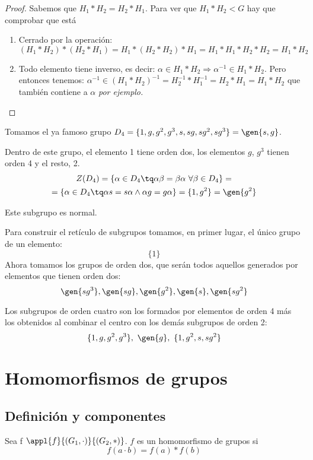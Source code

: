 \documentclass[nochap]{apuntes}
\begin{document}
 \begin{proof}
  Sabemos que $H_{1}\ast H_{2}=H_{2}\ast H_{1}$. Para ver que $H_{1}\ast H_{2}<G$  hay que comprobar que está
  \begin{enumerate}
   \item Cerrado por la operación: $(H_{1}\ast H_{2})\ast (H_{2}\ast H_{1})=H_{1}\ast (H_{2}\ast H_{2})\ast H_{1}=H_{1}\ast H_{1}\ast H_{2}\ast H_{2}=H_{1}\ast H_{2}$
   \item Todo elemento tiene inverso, es decir: $\alpha\in H_{1}\ast H_{2}\Rightarrow \alpha^{-1}\in H_{1}\ast H_{2}$. Pero entonces tenemos:
   $\alpha^{-1}\in (H_{1}\ast H_{2})^{-1} = H_{2}^{-1}\ast H_{1}^{-1}=H_{2}\ast H_{1}=H_{1}\ast H_{2}$ que también contiene a $\alpha$ \textit{por ejemplo.}
  \end{enumerate}

 \end{proof}

 \begin{example}
  Tomamos el ya famoso grupo $D_{4}=\{1,g,g^{2},g^{3}, s, sg, sg^{2}, sg^{3}\}=\gen{s,g}$.

  Dentro de este grupo, el elemento 1 tiene orden dos, los elementos $g$, $g^{3}$  tienen orden 4 y el resto, 2.
  \begin{gather*}
  Z(D_{4})= \{\alpha\in D_{4} \tq \alpha\beta=\beta\alpha \ \forall \beta \in D_{4}\}= \\
  = \{\alpha\in D_{4}\tq \alpha s = s\alpha \wedge \alpha g = g\alpha\}=\{1, g^{2}\}=\gen{g^{2}}
  \end{gather*}

  Este subgrupo es normal.

  Para construir el retículo de subgrupos tomamos, en primer lugar, el único grupo de un elemento:
  \[ \{1\} \]
  Ahora tomamos los grupos de orden dos, que serán todos aquellos generados por elementos que tienen orden dos:\\
  \[ \gen{sg^{3}}, \gen{sg}, \gen{g^{2}}, \gen{s}, \gen{sg^{2}} \]

  Los subgrupos de orden cuatro son los formados por elementos de orden 4 más los obtenidos al combinar el centro con los demás subgrupos de orden 2:
  \[ \{1,g,g^{2},g^{3}\}, \ \gen{g}, \ \{1, g^{2}, s, sg^{2}\} \]
 \end{example}

\section{Homomorfismos de grupos}
\subsection{Definición y componentes}
\begin{defn}[Homomorfismo]
 Sea f $\appl{f}{(G_1, \cdot )}{(G_2, \ast )}$. $f$ es un homomorfismo de grupos si
 \[ f(a\cdot b) = f(a)\ast f(b) \]
 \end{defn}
\end{document}
